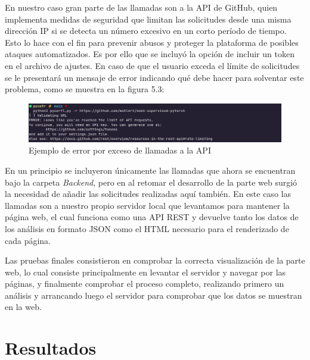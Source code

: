 \documentclass[a4paper, 12pt]{book}
\begin{document}
En nuestro caso gran parte de las llamadas son a la API de GitHub, quien implementa medidas de seguridad que limitan las solicitudes desde una misma dirección IP si se detecta un número excesivo en un corto período de tiempo. Esto lo hace con el fin para prevenir abusos y proteger la plataforma de posibles ataques automatizados. Es por ello que se incluyó la opción de incluir un token en el archivo de ajustes. En caso de que el usuario exceda el límite de solicitudes se le presentará un mensaje de error indicando qué debe hacer para solventar este problema, como se muestra en la figura 5.3: 

\vspace{1em}
\begin{figure}[H]
    \centering
    \includegraphics[width=\textwidth]{img/results/backend_exe_r_api_error.png}
    \caption{Ejemplo de error por exceso de llamadas a la API}
    \label{fig:api_limit}
\end{figure}
\vspace{1em}

En un principio se incluyeron únicamente las llamadas que ahora se encuentran bajo la carpeta \textit{Backend}, pero en al retomar el desarrollo de la parte web surgió la necesidad de añadir las solicitudes realizadas aquí también. En este caso las llamadas son a nuestro propio servidor local que levantamos para mantener la página web, el cual funciona como una API REST y devuelve tanto los datos de los análisis en formato JSON como el HTML necesario para el renderizado de cada página.

Las pruebas finales consistieron en comprobar la correcta visualización de la parte web, lo cual consiste principalmente en levantar el servidor y navegar por las páginas, y finalmente comprobar el proceso completo, realizando primero un análisis y arrancando luego el servidor para comprobar que los datos se muestran en la web.


\cleardoublepage
\chapter{Resultados}
\label{chap:resultados}
\end{document}
